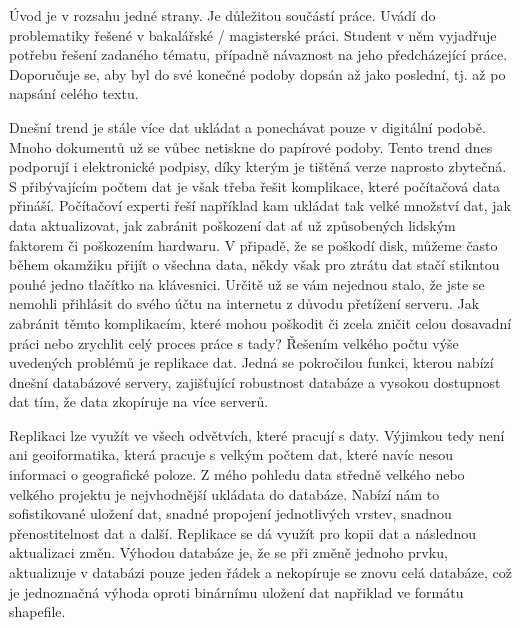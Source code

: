 
      Úvod je v rozsahu jedné strany. Je důležitou součástí práce. Uvádí
      do problematiky řešené v bakalářské / magisterské práci. Student v
      něm vyjadřuje potřebu řešení zadaného tématu, případně návaznost na
      jeho předcházející práce. Doporučuje se, aby byl do své konečné
      podoby dopsán až jako poslední, tj. až po napsání celého textu.

      Dnešní trend je stále více dat ukládat a ponechávat pouze v
      digitální podobě. Mnoho dokumentů už se vůbec netiskne do papírové
      podoby. Tento trend dnes podporují i elektronické podpisy, díky
      kterým je tištěná verze naprosto zbytečná. S přibývajícím počtem
      dat je však třeba řešit komplikace, které počítačová data přináší.
      Počítačoví experti řeší například kam ukládat tak velké množství
      dat, jak data aktualizovat, jak zabránit poškození dat ať už
      způsobených lidským faktorem či poškozením hardwaru. V připadě, že
      se poškodí disk, můžeme často během okamžiku přijít o všechna
      data, někdy však pro ztrátu dat stačí stikntou pouhé jedno
      tlačítko na klávesnici. Určitě už se vám nejednou stalo, že jste
      se nemohli přihlásit do svého účtu na internetu z důvodu přetížení
      serveru. Jak zabránit těmto komplikacím, které mohou poškodit či
      zcela zničit celou dosavadní práci nebo zrychlit celý proces práce
      s tady? Řešením velkého počtu výše uvedených problémů je replikace
      dat. Jedná se pokročilou funkci, kterou nabízí dnešní databázové
      servery, zajišťující robustnost databáze a vysokou dostupnost dat
      tím, že data zkopíruje na více serverů.
      
      Replikaci lze využít ve všech odvětvích, které pracují s daty.
      Výjimkou tedy není ani geoiformatika, která pracuje s velkým
      počtem dat, které navíc nesou informaci o geografické poloze. Z
      mého pohledu data středně velkého nebo velkého projektu je
      nejvhodnější ukládata do databáze. Nabízí nám to sofistikované
      uložení dat, snadné propojení jednotlivých vrstev, snadnou
      přenostitelnost dat a další. Replikace se dá využít pro kopii 
      dat a následnou aktualizaci změn. Výhodou databáze je, že se při
      změně jednoho prvku, aktualizuje v databázi pouze jeden řádek a
      nekopíruje se znovu celá databáze, což je jednoznačná výhoda
      oproti binárnímu uložení dat napřiklad ve formátu shapefile.
      
